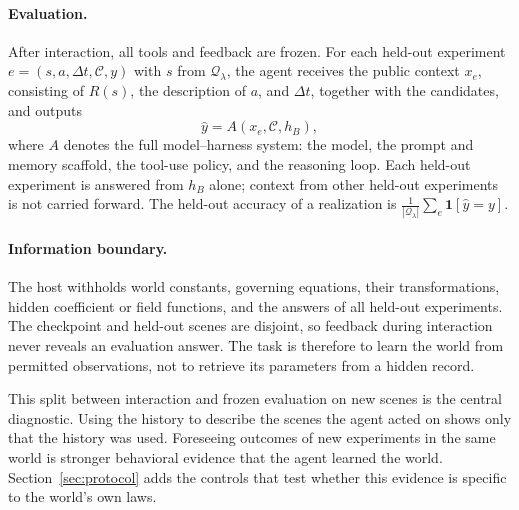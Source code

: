 \paragraph{Evaluation.} After interaction, all tools and feedback are frozen. For each held-out experiment $e=(s,a,\Delta t,\mathcal{C},y)$ with $s$ from $\mathcal{Q}_\lambda$, the agent receives the public context $x_e$, consisting of $R(s)$, the description of $a$, and $\Delta t$, together with the candidates, and outputs
\begin{equation}
  \hat{y} = A(x_e, \mathcal{C}, h_B),
  \label{eq:agent-objective}
\end{equation}
where $A$ denotes the full model--harness system: the model, the prompt and memory scaffold, the tool-use policy, and the reasoning loop. Each held-out experiment is answered from $h_B$ alone; context from other held-out experiments is not carried forward. The held-out accuracy of a realization is $\frac{1}{|\mathcal{Q}_\lambda|}\sum_{e}\mathbf{1}[\hat{y}=y]$.

\paragraph{Information boundary.} The host withholds world constants, governing equations, their transformations, hidden coefficient or field functions, and the answers of all held-out experiments. The checkpoint and held-out scenes are disjoint, so feedback during interaction never reveals an evaluation answer. The task is therefore to learn the world from permitted observations, not to retrieve its parameters from a hidden record.

This split between interaction and frozen evaluation on new scenes is the central diagnostic. Using the history to describe the scenes the agent acted on shows only that the history was used. Foreseeing outcomes of new experiments in the same world is stronger behavioral evidence that the agent learned the world. Section~\ref{sec:protocol} adds the controls that test whether this evidence is specific to the world's own laws.
